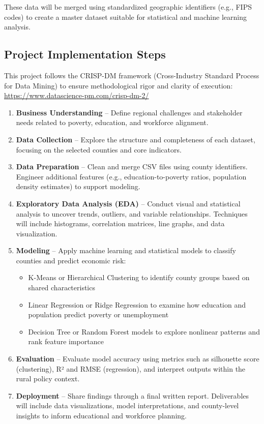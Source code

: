 \documentclass[12pt]{llncs}
\begin{document}
These data will be merged using standardized geographic identifiers (e.g., FIPS codes) to create a master dataset suitable for statistical and machine learning analysis.

\subsection{Project Implementation Steps}

This project follows the CRISP-DM framework (Cross-Industry Standard Process for Data Mining) to ensure methodological rigor and clarity of execution:
\href{https://www.datascience-pm.com/crisp-dm-2/}{https://www.datascience-pm.com/crisp-dm-2/}

\begin{enumerate}
    \item \textbf{Business Understanding} – Define regional challenges and stakeholder needs related to poverty, education, and workforce alignment.
    \item \textbf{Data Collection} – Explore the structure and completeness of each dataset, focusing on the selected counties and core indicators. 
    \item \textbf{Data Preparation} – Clean and merge CSV files using county identifiers. Engineer additional features (e.g., education-to-poverty ratios, population density estimates) to support modeling.
    \item \textbf{Exploratory Data Analysis (EDA)} – Conduct visual and statistical analysis to uncover trends, outliers, and variable relationships. Techniques will include histograms, correlation matrices, line graphs, and data visualization.
    \item \textbf{Modeling} – Apply machine learning and statistical models to classify counties and predict economic risk:
    \begin{itemize}
        \item K-Means or Hierarchical Clustering to identify county groups based on shared characteristics
        \item Linear Regression or Ridge Regression to examine how education and population predict poverty or unemployment
        \item Decision Tree or Random Forest models to explore nonlinear patterns and rank feature importance
    \end{itemize}
    \item \textbf{Evaluation} – Evaluate model accuracy using metrics such as silhouette score (clustering), R² and RMSE (regression), and interpret outputs within the rural policy context.
    \item \textbf{Deployment} – Share findings through a final written report. Deliverables will include data visualizations, model interpretations, and county-level insights to inform educational and workforce planning.
\end{enumerate}
\end{document}
